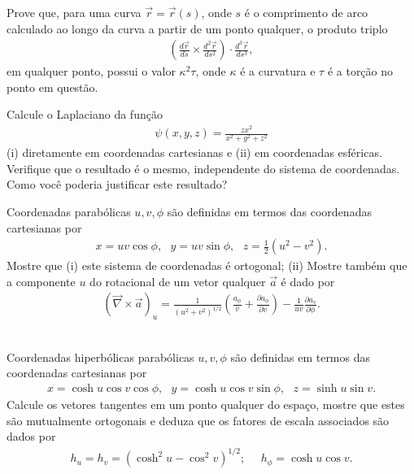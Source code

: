 \documentclass[a4paper,12pt]{article}
\begin{document}

\indent \par Prove que, para uma curva $\vec{r}=\vec{r}(s)$, onde $s$ é o comprimento de arco calculado ao longo da curva a partir de um ponto qualquer, o produto triplo
%
\begin{eqnarray}
\nonumber
\left( \frac{d\vec{r}}{ds} \times \frac{d^{2}\vec{r}}{ds^2} \right) \cdot \frac{d^{3}\vec{r}}{ds^3},
\end{eqnarray}
%
\noindent em qualquer ponto, possui o valor $\kappa^2 \tau$, onde $\kappa$ é a curvatura e $\tau$ é a torção no ponto em questão.\\


\indent \par Calcule o Laplaciano da função
%
\begin{eqnarray}
\nonumber
\psi(x,y,z)=\frac{zx^2}{x^2 + y^2 + z^2}
\end{eqnarray}
%
\noindent (i) diretamente em coordenadas cartesianas e (ii) em coordenadas esféricas. Verifique que o resultado é o mesmo, independente do sistema de coordenadas. Como você poderia justificar este resultado?

\newpage
{}

\indent \par Coordenadas parabólicas $u, v, \phi$ são definidas em termos das coordenadas cartesianas por
%
\begin{eqnarray}
\nonumber
x=uv \cos \phi, ~~~ y=uv\sin \phi, ~~~ z=\frac{1}{2}(u^2 - v^2).
\end{eqnarray}
%
\noindent Mostre que (i) este sistema de coordenadas é ortogonal; (ii) Mostre também que a componente $u$ do rotacional de um vetor qualquer $\vec{a}$ é dado por
%
\begin{eqnarray}
\nonumber
(\vec{\nabla} \times \vec{a})_{u}=\frac{1}{(u^2 + v^2)^{1/2}} \left( \frac{a_{\phi}}{v} + \frac{\partial a_{\phi}}{\partial v}\right) - \frac{1}{uv} \frac{\partial a_{v}}{\partial \phi}.
\end{eqnarray}\\



\indent \par Coordenadas hiperbólicas parabólicas $u, v, \phi$ são definidas em termos das coordenadas cartesianas por
%
\begin{eqnarray}
\nonumber
x=\cosh u \cos v \cos \phi, ~~~ y=\cosh u \cos v \sin \phi, ~~~ z=\sinh u \sin v .
\end{eqnarray}
%
\noindent Calcule os vetores tangentes em um ponto qualquer do espaço, mostre que estes são mutualmente ortogonais e deduza que os fatores de escala associados são dados por
%
\begin{eqnarray}
\nonumber
h_{u}=h_{v}=(\cosh^2 u - \cos^2 v)^{1/2}; ~~~~~~ h_{\phi}=\cosh u \cos v.
\end{eqnarray}\\
\end{document}
